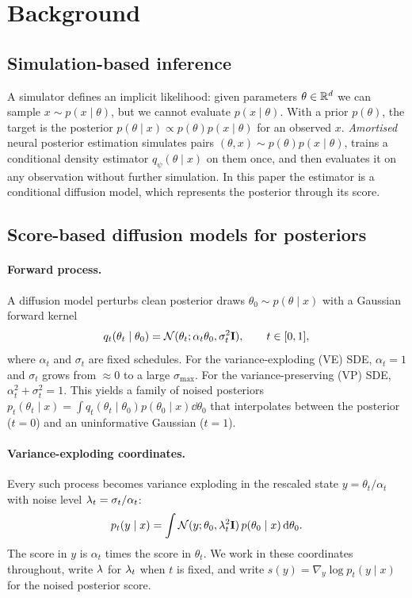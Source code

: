 \section{Background}\label{sec:background}

\subsection{Simulation-based inference}\label{sec:bg-sbi}

A simulator defines an implicit likelihood: given parameters $\theta\in\mathbb{R}^d$ we can sample $x\sim p(x\mid\theta)$, but we cannot evaluate $p(x\mid\theta)$.
With a prior $p(\theta)$, the target is the posterior $p(\theta\mid x)\propto p(\theta)p(x\mid\theta)$ for an observed $x$.
\emph{Amortised} neural posterior estimation simulates pairs $(\theta,x)\sim p(\theta)p(x\mid\theta)$, trains a conditional density estimator $q_\psi(\theta\mid x)$ on them once, and then evaluates it on any observation without further simulation.
In this paper the estimator is a conditional diffusion model, which represents the posterior through its score.

\subsection{Score-based diffusion models for posteriors}\label{sec:bg-diffusion}

\paragraph{Forward process.}
A diffusion model perturbs clean posterior draws $\theta_0\sim p(\theta\mid x)$ with a Gaussian forward kernel
\begin{equation}\label{eq:forward}
  q_t(\theta_t\mid\theta_0)=\mathcal{N}(\theta_t;\alpha_t\theta_0,\sigma_t^2\mathbf{I}),\qquad t\in[0,1],
\end{equation}
where $\alpha_t$ and $\sigma_t$ are fixed schedules.
For the variance-exploding (VE) SDE, $\alpha_t=1$ and $\sigma_t$ grows from $\approx0$ to a large $\sigma_{\max}$.
For the variance-preserving (VP) SDE, $\alpha_t^2+\sigma_t^2=1$.
This yields a family of noised posteriors $p_t(\theta_t\mid x)=\int q_t(\theta_t\mid\theta_0)p(\theta_0\mid x)\dd\theta_0$ that interpolates between the posterior ($t=0$) and an uninformative Gaussian ($t=1$).

\paragraph{Variance-exploding coordinates.}
Every such process becomes variance exploding in the rescaled state $y=\theta_t/\alpha_t$ with noise level $\lambda_t=\sigma_t/\alpha_t$:
\begin{equation}\label{eq:ve-kernel}
  p_t(y\mid x)=\int \mathcal{N}(y;\theta_0,\lambda_t^2\mathbf{I})\,p(\theta_0\mid x)\,\mathrm{d}\theta_0 .
\end{equation}
The score in $y$ is $\alpha_t$ times the score in $\theta_t$.
We work in these coordinates throughout, write $\lambda$ for $\lambda_t$ when $t$ is fixed, and write $s(y)=\nabla_y\log p_t(y\mid x)$ for the noised posterior score.

